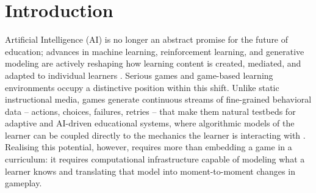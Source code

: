 \documentclass[11pt]{article}
\begin{document}
\section{Introduction}

Artificial Intelligence (AI) is no longer an abstract promise for the future of education; advances in machine learning, reinforcement learning, and generative modeling are actively reshaping how learning content is created, mediated, and adapted to individual learners \cite{ref1,ref2}. Serious games and game-based learning environments occupy a distinctive position within this shift. Unlike static instructional media, games generate continuous streams of fine-grained behavioral data -- actions, choices, failures, retries -- that make them natural testbeds for adaptive and AI-driven educational systems, where algorithmic models of the learner can be coupled directly to the mechanics the learner is interacting with \cite{ref3,ref4}. Realising this potential, however, requires more than embedding a game in a curriculum: it requires computational infrastructure capable of modeling what a learner knows and translating that model into moment-to-moment changes in gameplay.
\end{document}
